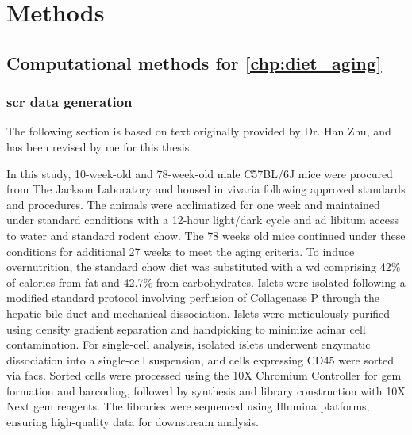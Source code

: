 
\chapter{Methods}
\label{chp:methods}

\newpage\null\thispagestyle{empty}\newpage

\section{Computational methods for \autoref{chp:diet_aging}}
\label{sec:chp2_methods}

\subsection[\glslink{scr}{scRNA-seq} data generation]{\large \gls{scr} data generation}
\vspace{3mm}
\begin{Comment2}
\vspace{1mm}
\hspace{-3mm}
The following section is based on text originally provided by Dr. Han Zhu, and has been revised by me for this thesis.
\vspace{1mm}
\end{Comment2}
\vspace{3mm}

In this study, 10-week-old and 78-week-old male C57BL/6J mice were procured from The Jackson Laboratory and housed in vivaria following approved standards and procedures. The animals were acclimatized for one week and maintained under standard conditions with a 12-hour light/dark cycle and ad libitum access to water and standard rodent chow. The 78 weeks old mice continued under these conditions for additional 27 weeks to meet the aging criteria. To induce overnutrition, the standard chow diet was substituted with a \acrfull{wd} comprising 42\% of calories from fat and 42.7\% from carbohydrates. Islets were isolated following a modified standard protocol involving perfusion of Collagenase P through the hepatic bile duct and mechanical dissociation. Islets were meticulously purified using density gradient separation and handpicking to minimize acinar cell contamination. For single-cell analysis, isolated islets underwent enzymatic dissociation into a single-cell suspension, and cells expressing CD45 were sorted via \acrfull{facs}. Sorted cells were processed using the 10X Chromium Controller for \gls{gem} formation and barcoding, followed by  synthesis and library construction with 10X Next \gls{gem} reagents. The libraries were sequenced using Illumina platforms, ensuring high-quality data for downstream analysis. 

